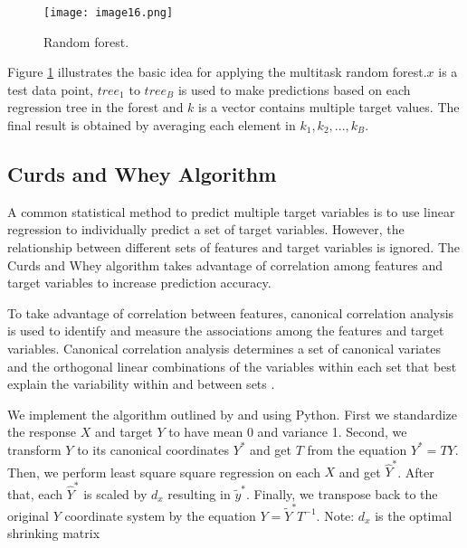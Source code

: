 \documentclass{article}
\begin{document}
\begin{figure}[h]
  \centering
  \texttt{[image: image16.png]}
  \caption[Caption for LOF]{Random forest.\footnotemark}
  \label{forest}
\end{figure}

Figure \ref{forest} illustrates the basic idea for applying the multitask random forest.$x$ is a test data point, $tree_{1}$ to $tree_{B}$ is used to make predictions based on each regression tree in the forest and $k$ is a vector contains multiple target values. The final result is obtained by averaging each element in $k_{1}, k_{2},..., k_{B}$.


\subsection{Curds and Whey Algorithm}

A common statistical method to predict multiple target variables is to use linear regression to individually predict a set of target variables. However, the relationship between different sets of features and target variables is ignored. The Curds and Whey algorithm takes advantage of correlation among features and target variables to increase prediction accuracy.

To take advantage of correlation between features, canonical correlation analysis is used to identify and measure the associations among the features and target variables. Canonical correlation analysis determines a set of canonical variates and the orthogonal linear combinations of the variables within each set that best explain the variability within and between sets \citep{kidd_implementation_2014}.

We implement the algorithm outlined by \citet{breiman_predicting_1997} and \citet{kidd_implementation_2014} using Python. First we standardize the response $X$ and target $Y$ to have mean 0 and variance 1. Second, we transform $Y$ to its canonical coordinates $Y^*$ and get $T$ from the equation $Y^* = TY$. Then, we perform least square square regression on each $X$ and get  $\widehat {Y}^*$.  After that, each $\widehat {Y}^*$ is scaled by $d_{x}$ resulting in $\widetilde{y}^*$.  Finally, we transpose back to the original $Y$ coordinate system by the equation $Y = \widetilde{Y}^* T^{-1}$. Note: $d_x$ is the optimal shrinking matrix
\end{document}
